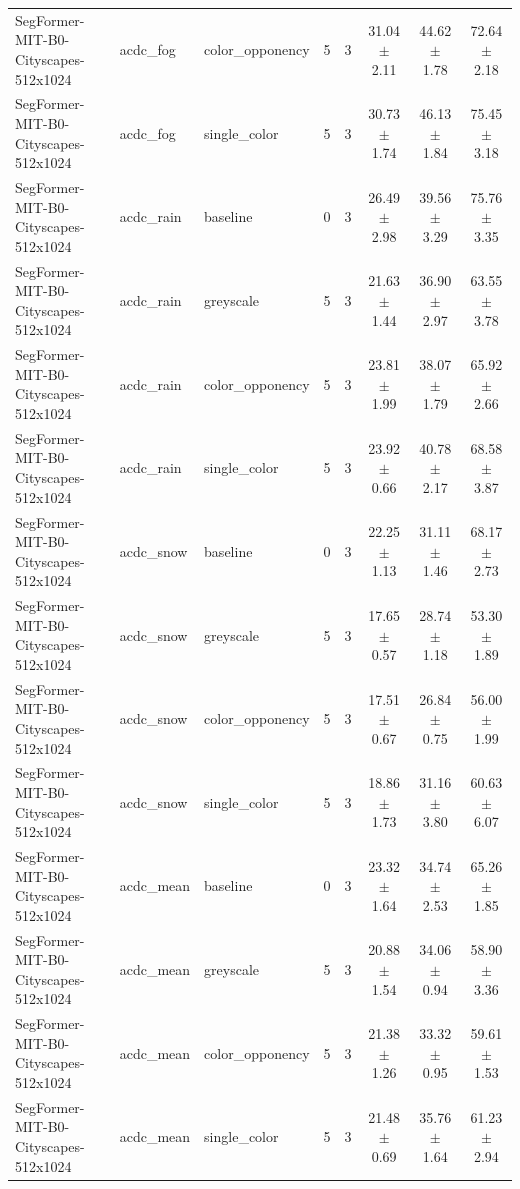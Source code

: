 \begin{tabular}{lllccccc}
SegFormer-MIT-B0-Cityscapes-512x1024 & acdc_fog & color_opponency & 5 & 3 & 31.04 $\pm$ 2.11 & 44.62 $\pm$ 1.78 & 72.64 $\pm$ 2.18 \\
SegFormer-MIT-B0-Cityscapes-512x1024 & acdc_fog & single_color & 5 & 3 & 30.73 $\pm$ 1.74 & 46.13 $\pm$ 1.84 & 75.45 $\pm$ 3.18 \\
SegFormer-MIT-B0-Cityscapes-512x1024 & acdc_rain & baseline & 0 & 3 & 26.49 $\pm$ 2.98 & 39.56 $\pm$ 3.29 & 75.76 $\pm$ 3.35 \\
SegFormer-MIT-B0-Cityscapes-512x1024 & acdc_rain & greyscale & 5 & 3 & 21.63 $\pm$ 1.44 & 36.90 $\pm$ 2.97 & 63.55 $\pm$ 3.78 \\
SegFormer-MIT-B0-Cityscapes-512x1024 & acdc_rain & color_opponency & 5 & 3 & 23.81 $\pm$ 1.99 & 38.07 $\pm$ 1.79 & 65.92 $\pm$ 2.66 \\
SegFormer-MIT-B0-Cityscapes-512x1024 & acdc_rain & single_color & 5 & 3 & 23.92 $\pm$ 0.66 & 40.78 $\pm$ 2.17 & 68.58 $\pm$ 3.87 \\
SegFormer-MIT-B0-Cityscapes-512x1024 & acdc_snow & baseline & 0 & 3 & 22.25 $\pm$ 1.13 & 31.11 $\pm$ 1.46 & 68.17 $\pm$ 2.73 \\
SegFormer-MIT-B0-Cityscapes-512x1024 & acdc_snow & greyscale & 5 & 3 & 17.65 $\pm$ 0.57 & 28.74 $\pm$ 1.18 & 53.30 $\pm$ 1.89 \\
SegFormer-MIT-B0-Cityscapes-512x1024 & acdc_snow & color_opponency & 5 & 3 & 17.51 $\pm$ 0.67 & 26.84 $\pm$ 0.75 & 56.00 $\pm$ 1.99 \\
SegFormer-MIT-B0-Cityscapes-512x1024 & acdc_snow & single_color & 5 & 3 & 18.86 $\pm$ 1.73 & 31.16 $\pm$ 3.80 & 60.63 $\pm$ 6.07 \\
SegFormer-MIT-B0-Cityscapes-512x1024 & acdc_mean & baseline & 0 & 3 & 23.32 $\pm$ 1.64 & 34.74 $\pm$ 2.53 & 65.26 $\pm$ 1.85 \\
SegFormer-MIT-B0-Cityscapes-512x1024 & acdc_mean & greyscale & 5 & 3 & 20.88 $\pm$ 1.54 & 34.06 $\pm$ 0.94 & 58.90 $\pm$ 3.36 \\
SegFormer-MIT-B0-Cityscapes-512x1024 & acdc_mean & color_opponency & 5 & 3 & 21.38 $\pm$ 1.26 & 33.32 $\pm$ 0.95 & 59.61 $\pm$ 1.53 \\
SegFormer-MIT-B0-Cityscapes-512x1024 & acdc_mean & single_color & 5 & 3 & 21.48 $\pm$ 0.69 & 35.76 $\pm$ 1.64 & 61.23 $\pm$ 2.94 \\
\bottomrule
\end{tabular}
